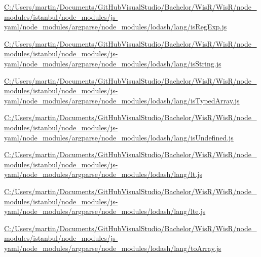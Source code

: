 \begin{DoxyCompactItemize}
\item 
\hyperlink{_c_1_2_users_2martin_2_documents_2_git_hub_visual_studio_2_bachelor_2_wis_r_2_wis_r_2node_module6c9c3bdf88c41a9145ee19b0c7a03f99}{C\+:/\+Users/martin/\+Documents/\+Git\+Hub\+Visual\+Studio/\+Bachelor/\+Wis\+R/\+Wis\+R/node\+\_\+modules/istanbul/node\+\_\+modules/js-\/yaml/node\+\_\+modules/argparse/node\+\_\+modules/lodash/lang/is\+Reg\+Exp.\+js}
\item 
\hyperlink{_c_1_2_users_2martin_2_documents_2_git_hub_visual_studio_2_bachelor_2_wis_r_2_wis_r_2node_moduleb9e394a74447fda6b76dee44118b971e}{C\+:/\+Users/martin/\+Documents/\+Git\+Hub\+Visual\+Studio/\+Bachelor/\+Wis\+R/\+Wis\+R/node\+\_\+modules/istanbul/node\+\_\+modules/js-\/yaml/node\+\_\+modules/argparse/node\+\_\+modules/lodash/lang/is\+String.\+js}
\item 
\hyperlink{_c_1_2_users_2martin_2_documents_2_git_hub_visual_studio_2_bachelor_2_wis_r_2_wis_r_2node_modulebfd5909c43962ad925f5661d0f1529db}{C\+:/\+Users/martin/\+Documents/\+Git\+Hub\+Visual\+Studio/\+Bachelor/\+Wis\+R/\+Wis\+R/node\+\_\+modules/istanbul/node\+\_\+modules/js-\/yaml/node\+\_\+modules/argparse/node\+\_\+modules/lodash/lang/is\+Typed\+Array.\+js}
\item 
\hyperlink{_c_1_2_users_2martin_2_documents_2_git_hub_visual_studio_2_bachelor_2_wis_r_2_wis_r_2node_module5b4f1dce1186bdc2e4e8148cbcdc9e7a}{C\+:/\+Users/martin/\+Documents/\+Git\+Hub\+Visual\+Studio/\+Bachelor/\+Wis\+R/\+Wis\+R/node\+\_\+modules/istanbul/node\+\_\+modules/js-\/yaml/node\+\_\+modules/argparse/node\+\_\+modules/lodash/lang/is\+Undefined.\+js}
\item 
\hyperlink{_c_1_2_users_2martin_2_documents_2_git_hub_visual_studio_2_bachelor_2_wis_r_2_wis_r_2node_module1479728f378fc54a66f4a0ad1d4e598a}{C\+:/\+Users/martin/\+Documents/\+Git\+Hub\+Visual\+Studio/\+Bachelor/\+Wis\+R/\+Wis\+R/node\+\_\+modules/istanbul/node\+\_\+modules/js-\/yaml/node\+\_\+modules/argparse/node\+\_\+modules/lodash/lang/lt.\+js}
\item 
\hyperlink{_c_1_2_users_2martin_2_documents_2_git_hub_visual_studio_2_bachelor_2_wis_r_2_wis_r_2node_module93e085ebcc5394c6fc4fe3ea664a16b3}{C\+:/\+Users/martin/\+Documents/\+Git\+Hub\+Visual\+Studio/\+Bachelor/\+Wis\+R/\+Wis\+R/node\+\_\+modules/istanbul/node\+\_\+modules/js-\/yaml/node\+\_\+modules/argparse/node\+\_\+modules/lodash/lang/lte.\+js}
\item 
\hyperlink{_c_1_2_users_2martin_2_documents_2_git_hub_visual_studio_2_bachelor_2_wis_r_2_wis_r_2node_module64fdf711fb5c2588c29c1fc5e6fb5d12}{C\+:/\+Users/martin/\+Documents/\+Git\+Hub\+Visual\+Studio/\+Bachelor/\+Wis\+R/\+Wis\+R/node\+\_\+modules/istanbul/node\+\_\+modules/js-\/yaml/node\+\_\+modules/argparse/node\+\_\+modules/lodash/lang/to\+Array.\+js}

\end{DoxyCompactItemize}
